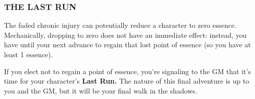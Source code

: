 \documentclass[oneside,10pt]{article}
\begin{document}
\begin{multicols}{2}
\subsubsection{THE LAST RUN}
The faded chronic injury can potentially reduce a character to zero essence. Mechanically, dropping to zero
does not have an immediate effect: instead, you have
until your next advance to regain that lost point of essence (so you have at least 1 essence).

If you elect not to regain a point of essence, you’re signaling to the GM that it’s time for your character’s\textbf{ Last
Run.} The nature of this final adventure is up to you and
the GM, but it will be your final walk in the shadows.

\end{multicols}

\end{document}
